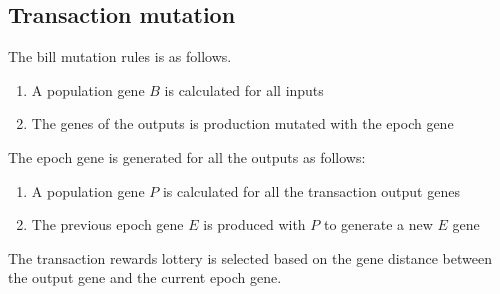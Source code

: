 \subsection{Transaction mutation}
The bill mutation rules is as follows.

\begin{enumerate}[{B}.1]
 \item A population gene $B$ is calculated for all inputs
 \item The genes of the outputs is production mutated with the epoch gene
\end{enumerate}

The epoch gene is generated for all the outputs as follows:
\begin{enumerate}[{P}.1]
 \item A population gene $P$ is calculated for all the transaction output genes
 \item The previous epoch gene $E$ is produced with $P$ to generate a new $E$ gene
\end{enumerate}

The transaction rewards lottery is selected based on the gene distance between the output gene and the current epoch gene.




